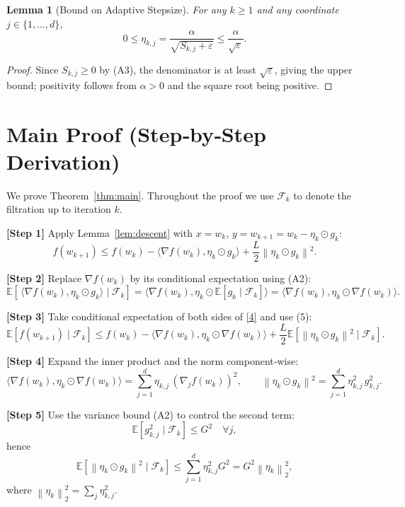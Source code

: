 \documentclass{article}
\newtheorem{lemma}{Lemma}
\newcommand{\norm}[1]{\left\|#1\right\|}
\begin{document}
\begin{lemma}[Bound on Adaptive Stepsize]
\label{lem:stepsize}
For any $k\ge1$ and any coordinate $j\in\{1,\dots,d\}$,
\[
0\le \eta_{k,j}= \frac{\alpha}{\sqrt{S_{k,j}+\varepsilon}}\le \frac{\alpha}{\sqrt{\varepsilon}}.
\]
\end{lemma}
\begin{proof}
Since $S_{k,j}\ge0$ by (A3), the denominator is at least $\sqrt{\varepsilon}$, giving the upper bound; positivity follows from $\alpha>0$ and the square root being positive. \qedhere
\end{proof}

\section*{Main Proof (Step‑by‑Step Derivation)}
We prove Theorem~\ref{thm:main}. Throughout the proof we use $\mathcal{F}_{k}$ to denote the filtration up to iteration $k$.

\bigskip
\noindent\textbf{[Step 1]} Apply Lemma~\ref{lem:descent} with $x=w_{k}$, $y=w_{k+1}=w_{k}-\eta_{k}\odot g_{k}$:
\[
f(w_{k+1})\le f(w_{k})-\langle\nabla f(w_{k}),\eta_{k}\odot g_{k}\rangle
+\frac{L}{2}\norm{\eta_{k}\odot g_{k}}^{2}.
\tag{4}
\]

\noindent\textbf{[Step 2]} Replace $\nabla f(w_{k})$ by its conditional expectation using (A2):
\[
\mathbb{E}\!\left[\,\langle\nabla f(w_{k}),\eta_{k}\odot g_{k}\rangle\mid\mathcal{F}_{k}\right]
= \langle\nabla f(w_{k}),\eta_{k}\odot \mathbb{E}[g_{k}\mid\mathcal{F}_{k}]\rangle
= \langle\nabla f(w_{k}),\eta_{k}\odot \nabla f(w_{k})\rangle.
\tag{5}
\]

\noindent\textbf{[Step 3]} Take conditional expectation of both sides of \eqref{4} and use (5):
\[
\mathbb{E}\!\left[f(w_{k+1})\mid\mathcal{F}_{k}\right]
\le f(w_{k})-\langle\nabla f(w_{k}),\eta_{k}\odot \nabla f(w_{k})\rangle
+\frac{L}{2}\mathbb{E}\!\left[\norm{\eta_{k}\odot g_{k}}^{2}\mid\mathcal{F}_{k}\right].
\tag{6}
\]

\noindent\textbf{[Step 4]} Expand the inner product and the norm component‑wise:
\[
\langle\nabla f(w_{k}),\eta_{k}\odot \nabla f(w_{k})\rangle
= \sum_{j=1}^{d}\eta_{k,j}\,(\nabla_{j}f(w_{k}))^{2},
\qquad
\norm{\eta_{k}\odot g_{k}}^{2}
= \sum_{j=1}^{d}\eta_{k,j}^{2}\,g_{k,j}^{2}.
\tag{7}
\]

\noindent\textbf{[Step 5]} Use the variance bound (A2) to control the second term:
\[
\mathbb{E}\!\left[g_{k,j}^{2}\mid\mathcal{F}_{k}\right]\le G^{2}\quad\forall j,
\]
hence
\[
\mathbb{E}\!\left[\norm{\eta_{k}\odot g_{k}}^{2}\mid\mathcal{F}_{k}\right]
\le \sum_{j=1}^{d}\eta_{k,j}^{2} G^{2}
= G^{2}\norm{\eta_{k}}^{2}_{2},
\tag{8}
\]
where $\norm{\eta_{k}}_{2}^{2}= \sum_{j}\eta_{k,j}^{2}$.
\end{document}

